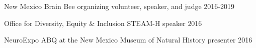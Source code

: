 
\begin{cvhonors}
  \cvhonor
    {New Mexico Brain Bee} %
    {organizing volunteer, speaker, and judge} %
    {} %
    {2016-2019} %
    
  \cvhonor
    {Office for Diversity, Equity \& Inclusion STEAM-H} %
    {speaker} %
    {} %
    {2016} %

  \cvhonor
    {NeuroExpo ABQ at the New Mexico Museum of Natural History} %
    {presenter} %
    {} %
    {2016} %
\end{cvhonors}    
    